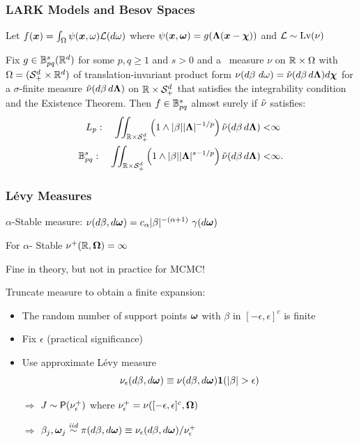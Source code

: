\documentclass[dvips]{beamer}
\newcommand{\bs}[2]{\begin{frame} \frametitle{#1} 
{#2}
\end{frame} }
\begin{document}
\bs{LARK Models and Besov Spaces} {
Let $f(\bm x) = \int_\Omega \psi(\bm x, \omega) {\cal L}(d \omega)$ where
$\psi(\bm x, \bm \omega) = g(\bm \Lambda(\bm x - \bm \chi))$ and ${\cal L} \sim \mbox{\rm Lv}(\nu)$
\begin{theorem}
  Fix ${g} \in {\ensuremath{{\mathbb{B}}^s_{pq}}}(\mathbb{R}^d)$ for some $p, q \ge 1$ and $s > 0$ and a \Levy\
  measure $\nu$ on $\mathbb{R}\times\Omega$ with $\Omega=({{\cal S}^d_+} \times \mathbb{R}^d)$ of
  translation-invariant product form $\nu(d\beta ~ d\omega) = {\tilde\nu}(d\beta\,
  d\bm \Lambda) d\bm \chi$  for a $\sigma$-finite measure
  ${\tilde\nu} (d\beta\, d\bm \Lambda)$ on $\mathbb{R} \times {{\cal S}^d_+}$ that satisfies the
  integrability condition \Eqn{eq:l1-bound} and the Existence Theorem.  Then 
  $f \in {\ensuremath{{\mathbb{B}}^s_{pq}}}$ almost surely if ${\tilde\nu}$ satisfies:
\begin{subequations}
\begin{align}
L_p: \quad  \iint_{\mathbb{R} \times {{\cal S}^d_+}} \left(1\wedge|\beta| |\bm \Lambda|^{- 1/p}\right)
                {\tilde\nu}(d\beta\, d\bm \Lambda)  < &\infty  \label{e:Lp}\\
{{\mathbb{B}}^s_{pq}}: \quad  \iint_{\mathbb{R} \times {{\cal S}^d_+}} \left(1\wedge|\beta| |\bm \Lambda|^{s - 1/p}\right)
                 {\tilde\nu}(d\beta\, d\bm \Lambda)  < &\infty.  \label{e:Bspq}
\end{align}
\end{subequations}
\end{theorem}
}

\bs{L\'evy Measures} {

$\alpha$-Stable measure: $\nu(d\beta, d\bm \omega) =  c_\alpha |\beta|^{-(\alpha
    +1)}\ \gamma(d\bm \omega)$

For $\alpha$- Stable $\nu^+(\mathbb{R}, \bm \Omega) = \infty$  

Fine in theory, but not in practice for MCMC!

\vspace{.25in}
Truncate measure to obtain a finite expansion:
\begin{itemize}
 \item The random number of support points $\bm \omega$ with $\beta$ in $[-\epsilon, \epsilon]^c$ is finite
\item Fix $\epsilon$  (practical significance) 
\item Use approximate L\'evy  measure 
$$\nu_{\epsilon}(d\beta, d\bm \omega) \equiv \nu(d\beta,
d\bm \omega){\bm 1}(|\beta| > \epsilon) $$
\item[$\Rightarrow$] $J \sim \mbox{\sf P}(\nu_{\epsilon}^+)$ where
  $\nu^+_{\epsilon} = \nu([-\epsilon, \epsilon]^c, \bm \Omega)$
\item[$\Rightarrow$]  $\beta_j, \bm \omega_j \mathrel{\mathop{\sim}\limits^{\mathit{iid}}} \pi(d\beta, d\bm \omega) \equiv
  \nu_\epsilon(d\beta , d \bm \omega)/\nu^+_{\epsilon}$

\end{itemize}
}
\end{document}
